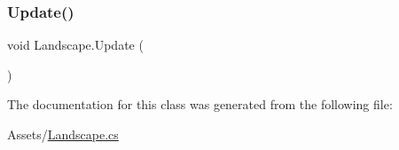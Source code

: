 \subsubsection{\texorpdfstring{Update()}{Update()}}
{\footnotesize\ttfamily void Landscape.\+Update (\begin{DoxyParamCaption}{ }\end{DoxyParamCaption})\hspace{0.3cm}{\ttfamily [private]}}



The documentation for this class was generated from the following file\+:\begin{DoxyCompactItemize}
\item 
Assets/\hyperlink{_landscape_8cs}{Landscape.\+cs}\end{DoxyCompactItemize}
